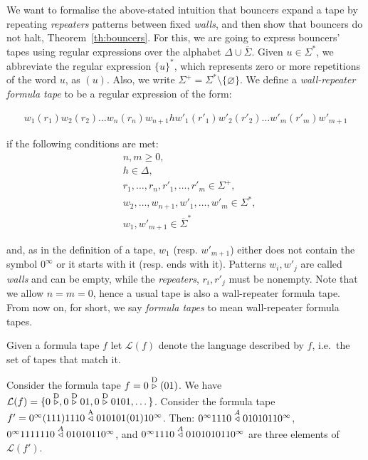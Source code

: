 We want to formalise the above-stated intuition that bouncers expand a tape by repeating \textit{repeaters} patterns between fixed \textit{walls}, and then show that bouncers do not halt, Theorem~\ref{th:bouncers}. For this, we are going to express bouncers' tapes using regular expressions over the alphabet $\Delta \cup  \overline{\Sigma}$. Given $u\in\Sigma^*$, we abbreviate the regular expression $\{u\}^*$, which represents zero or more repetitions of the word $u$, as $(u)$. Also, we write $\Sigma^+ = \Sigma^* \setminus \{ \varnothing \}$. We define a \textit{wall-repeater formula tape} to be a regular expression of the form:

\begin{align}\label{math:formulaTapes}w_1(r_1)w_2(r_2)\dots w_n(r_n) w_{n+1} h w'_1(r'_1)w'_2(r'_2)\dots w'_m(r'_m) w'_{m+1}\end{align}

if the following conditions are met:
\begin{align*}
     & n,m \geq 0,                                     \\
     & h \in \Delta,                                   \\
     & r_1,\dots,r_n,r'_1,\dots,r'_m \in \Sigma^+,     \\
     & w_2,\dots,w_{n+1},w'_1,\dots,w'_m \in \Sigma^*, \\
     & w_1, w'_{m+1} \in  \overline{\Sigma}^*
\end{align*}

and, as in the definition of a tape, $w_1$ (resp. $w'_{m+1}$) either does not contain the symbol $0^\infty$ or it starts with it (resp. ends with it). Patterns $w_i, w'_j$ are called \textit{walls} and can be empty, while the \textit{repeaters}, $r_i, r'_j$ must be nonempty. Note that we allow $n=m=0$, hence a usual tape is also a wall-repeater formula tape. From now on, for short, we say \textit{formula tapes} to mean wall-repeater formula tapes.

Given a formula tape $f$ let $\mathcal{L}(f)$ denote the language described by $f$, i.e.\ the set of tapes that match it.

\begin{example}\label{ex:formulaTapes}
    Consider the formula tape $f = 0 \stackrel{\text{D}}\triangleright (01)$. We have $\mathcal{L}(f) = \{0\stackrel{\text{D}}\triangleright,0\stackrel{\text{D}}\triangleright01,0\stackrel{\text{D}}\triangleright0101,\dots\}$. Consider the formula tape $f'=0^\infty(111)1110 \stackrel{\text{A}}\triangleleft 010101(01)10^\infty$. Then: $0^\infty 1110 \stackrel{A}\triangleleft 01010110^\infty$, $0^\infty 1111110 \stackrel{A}\triangleleft 01010110^\infty$, and $0^\infty 1110 \stackrel{A}\triangleleft 0101010110^\infty$ are three elements of $\mathcal{L}(f')$.
\end{example}

